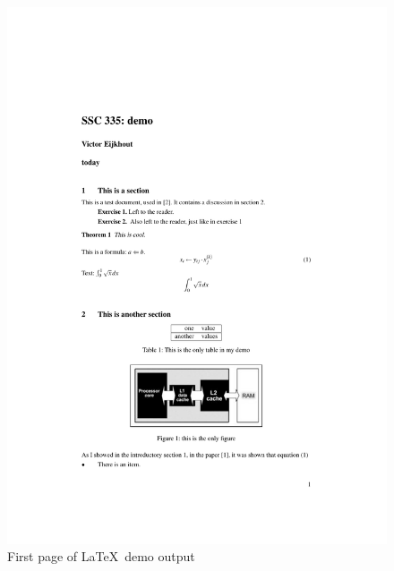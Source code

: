 \begin{figure}[p]
  \includegraphics[scale=.75]{code/latexdemo/demopage1}
  \caption{First page of \LaTeX\ demo output}
  \label{fig:latex-page1}
\end{figure}

